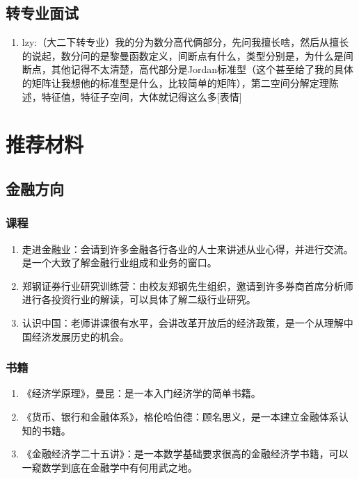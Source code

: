 \documentclass[a4paper,11pt,notitlepage]{article}
\begin{document}
\begin{appendices}
\subsection{转专业面试}\label{转专业面试详细}
\begin{adjustwidth}{2em}{0pt}
\begin{enumerate}
    \item lzy:（大二下转专业）我的分为数分高代俩部分，先问我擅长啥，然后从擅长的说起，数分问的是黎曼函数定义，间断点有什么，类型分别是，为什么是间断点，其他记得不太清楚，高代部分是Jordan标准型（这个甚至给了我的具体的矩阵让我想他的标准型是什么，比较简单的矩阵），第二空间分解定理陈述，特征值，特征子空间，大体就记得这么多[表情]
\end{enumerate}
\end{adjustwidth}
\section{推荐材料}
\subsection{金融方向}
\subsubsection{课程}\label{金融推荐课程}
\begin{adjustwidth}{3em}{0pt}
\begin{enumerate}
    \item 走进金融业：会请到许多金融各行各业的人士来讲述从业心得，并进行交流。是一个大致了解金融行业组成和业务的窗口。
    \item 郑钢证券行业研究训练营：由校友郑钢先生组织，邀请到许多券商首席分析师进行各投资行业的解读，可以具体了解二级行业研究。
    \item 认识中国：老师讲课很有水平，会讲改革开放后的经济政策，是一个从理解中国经济发展历史的机会。
\end{enumerate}
\end{adjustwidth}

\subsubsection{书籍}\label{金融推荐书籍}
\begin{adjustwidth}{3em}{0pt}
\begin{enumerate}
    \item 《经济学原理》，曼昆：是一本入门经济学的简单书籍。
    \item 《货币、银行和金融体系》，格伦哈伯德：顾名思义，是一本建立金融体系认知的书籍。
    \item 《金融经济学二十五讲》：是一本数学基础要求很高的金融经济学书籍，可以一窥数学到底在金融学中有何用武之地。
\end{enumerate}
\end{adjustwidth}


\end{appendices}
\end{document}
